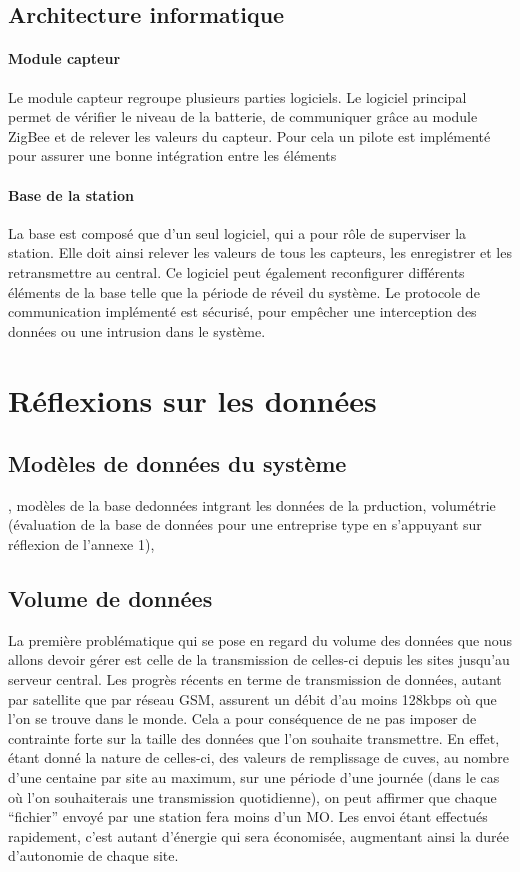 \subsection{Architecture informatique}

\paragraph{Module capteur} Le module capteur regroupe plusieurs parties logiciels. Le logiciel principal permet de vérifier le niveau de la batterie, de communiquer grâce au module ZigBee et de relever les valeurs du capteur. Pour cela un pilote est implémenté pour assurer une bonne intégration entre les éléments

\paragraph{Base de la station} La base est composé que d’un seul logiciel, qui a pour rôle de superviser la station. Elle doit ainsi relever les valeurs de tous les capteurs, les enregistrer et les retransmettre au central. Ce logiciel peut également reconfigurer différents éléments de la base telle que la période de réveil du système. Le protocole de communication implémenté est sécurisé, pour empêcher une interception des données ou une intrusion dans le système.

\section{Réflexions sur les données}

\subsection{Modèles de données du système}

, modèles de la base dedonnées intgrant les données de la prduction, volumétrie (évaluation de la base de données
pour une entreprise type en s’appuyant sur réflexion de l’annexe 1),

\subsection{Volume de données}

La première problématique qui se pose en regard du volume des données que nous allons devoir gérer est celle de la transmission de celles-ci depuis les sites jusqu'au serveur central. Les progrès récents en terme de transmission de données, autant par satellite que par réseau GSM, assurent un débit d'au moins 128kbps où que l'on se trouve dans le monde. Cela a pour conséquence de ne pas imposer de contrainte forte sur la taille des données que l'on souhaite transmettre. En effet, étant donné la nature de celles-ci, des valeurs de remplissage de cuves, au nombre d'une centaine par site au maximum, sur une période d'une journée (dans le cas où l'on souhaiterais une transmission quotidienne), on peut affirmer que chaque ``fichier'' envoyé par une station fera moins d'un MO. Les envoi étant effectués rapidement, c'est autant d'énergie qui sera économisée, augmentant ainsi la durée d'autonomie de chaque site.

